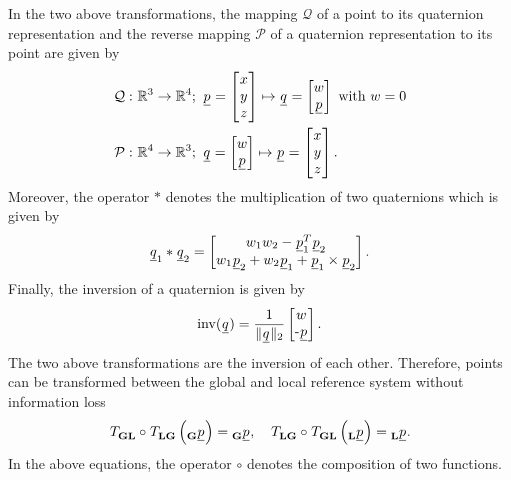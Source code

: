 In the two above transformations,
the mapping $\mathcal{Q}$
of a point to its quaternion representation 
and the reverse mapping $\mathcal{P}$ 
of a quaternion representation to its point  
are given by
\begin{align}
    \mathcal{Q}
    :\ 
    & \mathbb{R}^3 \rightarrow \mathbb{R}^4
    ;\
    \pos[]{}{}{}{} = \begin{bmatrix} \x[]{}{}{}{} \\ \y[]{}{}{}{} \\ \z[]{}{}{}{} \end{bmatrix} 
    \mapsto
    \quat[]{}{}{}{} = \begin{bmatrix} w \\ \underline p \end{bmatrix} 
    \text{ with } w = 0
    \nonumber \\
    \mathcal{P}
    :\ 
    &\mathbb{R}^4 \rightarrow \mathbb{R}^3
    ;\
    \quat[]{}{}{}{} = \begin{bmatrix} w \\ \underline p \end{bmatrix} 
    \mapsto
    \pos[]{}{}{}{} = \begin{bmatrix} \x[]{}{}{}{} \\ \y[]{}{}{}{} \\ \z[]{}{}{}{} \end{bmatrix}.
\end{align}
Moreover, the operator $*$ denotes the multiplication of two quaternions which is given by
\begin{align}
    \quat[]{}{1}{}{} * \quat[]{}{2}{}{}
    = 
    \begin{bmatrix}
        w_1 w_2 - \pos[]{T}{1}{}{} \pos[]{}{2}{}{}\\ 
        w_1 \pos[]{}{2}{}{} + w_2 \pos[]{}{1}{}{} + \pos[]{}{1}{}{} \times \pos[]{}{2}{}{}
    \end{bmatrix}.
\end{align}
Finally, the inversion of a quaternion is given by
\begin{align}
    \mathrm{inv}(\quat[]{}{}{}{}) 
    = 
    \frac{1}{\| \quat[]{}{}{}{} \|_2}
    \begin{bmatrix} w \\ \text - \pos[]{}{}{}{} \end{bmatrix}.
\end{align}
The two above transformations are the inversion of each other.
Therefore, points can be transformed between the global and local reference system
without information loss
\begin{equation}
    \trafo[]{}{\grs\lrs}{}{} \circ \trafo[]{}{\lrs\grs}{}{} 
    \left( \pos[]{}{}{\grs}{} \right)
    =
    \pos[]{}{}{\grs}{}
    ,\quad
    \trafo[]{}{\lrs\grs}{}{} \circ \trafo[]{}{\grs\lrs}{}{} 
    \left( \pos[]{}{}{\lrs}{} \right)
    =
    \pos[]{}{}{\lrs}{}.
\end{equation}
In the above equations, the operator $\circ$ denotes the composition of two functions.



